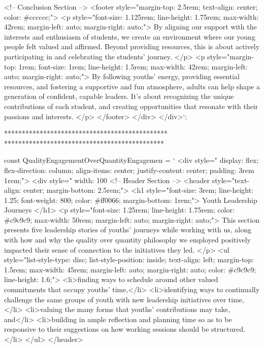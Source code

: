             <!-- Conclusion Section -->
            <footer style="margin-top: 2.5rem; text-align: center; color: #cccccc;">
                <p style="font-size: 1.125rem; line-height: 1.75rem; max-width: 42rem; margin-left: auto; margin-right: auto;">
                    By aligning our support with the interests and enthusiasm of students, we create an environment where our young people felt valued and affirmed. Beyond providing resources, this is about actively participating in and celebrating the students’ journey.
                </p>
                <p style="margin-top: 1rem; font-size: 1rem; line-height: 1.5rem; max-width: 42rem; margin-left: auto; margin-right: auto;">
                    By following youths’ energy, providing essential resources, and fostering a supportive and fun atmosphere, adults can help shape a generation of confident, capable leaders. It’s about recognizing the unique contributions of each student, and creating opportunities that resonate with their passions and interests.
                </p>
            </footer>
        </div>
    </div>`;

    **********************************************
    *********************************************


    const QualityEngagementOverQuantityEngagemen = ` <div style=" display: flex; flex-direction: column; align-items: center; justify-content: center; padding: 3rem 1rem;">
        <div style=" width: 100%
            <!-- Header Section -->
            <header style="text-align: center; margin-bottom: 2.5rem;">
                <h1 style="font-size: 3rem; line-height: 1.25; font-weight: 800; color: #ff0066; margin-bottom: 1rem;">
                    Youth Leadership Journeys
                </h1>
                <p style="font-size: 1.25rem; line-height: 1.75rem; color: #c9c9c9; max-width: 50rem; margin-left: auto; margin-right: auto;">
                    This section presents five leadership stories of youths’ journeys while working with us, along with how and why the quality over quantity philosophy we employed positively impacted their sense of connection to the initiatives they led.
                </p>
                <ul style="list-style-type: disc; list-style-position: inside; text-align: left; margin-top: 1.5rem; max-width: 45rem; margin-left: auto; margin-right: auto; color: #c9c9c9; line-height: 1.6;">
                    <li>finding ways to schedule around other valued commitments that occupy youths’ time,</li>
                    <li>identifying ways to continually challenge the same groups of youth with new leadership initiatives over time,</li>
                    <li>valuing the many forms that youths’ contributions may take, and</li>
                    <li>building in ample reflection and planning time so as to be responsive to their suggestions on how working sessions should be structured.</li>
                </ul>
            </header>

